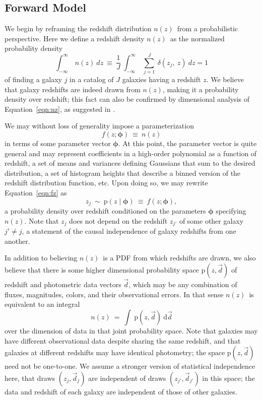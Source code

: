 \documentclass[iop]{emulateapj}
\newcommand{\Eq}[1]{Equation~\ref{#1}}
\newcommand{\nz}{$n(z)$}
\newcommand{\data}{\ensuremath{\vec{d}}}
\newcommand{\pr}[1]{\ensuremath{\mathrm{p}(#1)}}
\newcommand{\gvn}{\mid}%
\newcommand{\integral}[2]{\ensuremath{\int\ #1\ \mathrm{d} #2}}
\newcommand{\bvec}[1]{{\ensuremath{\boldsymbol{#1}}}}
\newcommand{\ndphi}{\bvec{\phi}}
\begin{document}
\subsection{Forward Model}
\label{sec:forward}

We begin by reframing the redshift distribution \nz\ from a probabilistic 
perspective.
Here we define a redshift density \nz\ as the normalized probability density
\begin{equation}
\label{eqn:nz}
\int_{-\infty}^{\infty}\ n(z)\ dz\ \equiv\ \frac{1}{J}\ 
\int_{-\infty}^{\infty}\ \sum_{j=1}^{J}\ \delta(z_{j},\ z)\ dz = 1
\end{equation}
of finding a galaxy $j$ in a catalog of $J$ galaxies having a redshift $z$.
We believe that galaxy redshifts are indeed drawn from \nz, making it a 
probability density over redshift; this fact can also be confirmed by 
dimensional analysis of \Eq{eqn:nz}, as suggested in \citet{Hogg2012}.

We may without loss of generality impose a parameterization
\begin{equation}
\label{eqn:fz}
f(z; \ndphi)\ \equiv\ n(z)
\end{equation}
in terms of some parameter vector $\ndphi$.
At this point, the parameter vector is quite general and may represent 
coefficients in a high-order polynomial as a function of redshift, a set of 
means and variances defining Gaussians that sum to the desired distribution, a 
set of histogram heights that describe a binned version of the redshift 
distribution function, etc.
Upon doing so, we may rewrite \Eq{eqn:fz} as 
\begin{equation}
\label{eqn:pz}
z_{j}\ \sim\ \pr{z \gvn \ndphi}\ \equiv\ f(z; \ndphi),
\end{equation}
a probability density over redshift conditioned on the parameters $\ndphi$ 
specifying \nz.
Note that $z_{j}$ does not depend on the redshift $z_{j'}$ of some other galaxy 
$j' \neq j$, a statement of the causal independence of galaxy redshifts from 
one another.

In addition to believing \nz\ is a PDF from which redshifts are drawn, we also 
believe that there is some higher dimensional probability space $\pr{z, \data}$ 
of redshift and photometric data vectors $\data$, which may be any combination 
of fluxes, magnitudes, colors, and their observational errors.
In that sense \nz\ is equivalent to an integral
\begin{equation}
\label{eqn:integral}
n(z)\ =\ \integral{\pr{z, \data}}{\data}
\end{equation}
over the dimension of data in that joint probability space.
Note that galaxies may have different observational data despite sharing the 
same redshift, and that galaxies at different redshifts may have identical 
photometry; the space $\pr{z, \data}$ need not be one-to-one.
We assume a stronger version of statistical independence here, that draws 
$(z_{j}, \data_{j})$ are independent of draws $(z_{j'}, \data_{j'})$ in this 
space; the data and redshift of each galaxy are independent of those of other 
galaxies.
\end{document}

